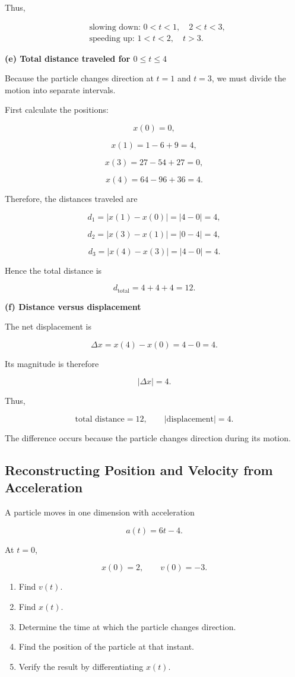 \documentclass[12pt]{article}
\theoremstyle{remark}
\begin{document}
Thus,

\[
\boxed{
\begin{aligned}
&\text{slowing down: } 0<t<1,\quad 2<t<3,\\
&\text{speeding up: } 1<t<2,\quad t>3.
\end{aligned}
}
\]

\textbf{(e) Total distance traveled for \(0\leq t\leq4\)}

Because the particle changes direction at \(t=1\) and \(t=3\), we must divide the motion into separate intervals.

First calculate the positions:

\[
x(0)=0,
\]

\[
x(1)=1-6+9=4,
\]

\[
x(3)=27-54+27=0,
\]

\[
x(4)=64-96+36=4.
\]

Therefore, the distances traveled are

\[
d_1=|x(1)-x(0)|=|4-0|=4,
\]

\[
d_2=|x(3)-x(1)|=|0-4|=4,
\]

\[
d_3=|x(4)-x(3)|=|4-0|=4.
\]

Hence the total distance is

\[
\boxed{
d_{\mathrm{total}}=4+4+4=12.
}
\]

\textbf{(f) Distance versus displacement}

The net displacement is

\[
\Delta x=x(4)-x(0)=4-0=4.
\]

Its magnitude is therefore

\[
|\Delta x|=4.
\]

Thus,

\[
\boxed{
\text{total distance}=12,
\qquad
|\text{displacement}|=4.
}
\]

The difference occurs because the particle changes direction during its motion.


\subsection{Reconstructing Position and Velocity from Acceleration}

A particle moves in one dimension with acceleration

\[
a(t)=6t-4.
\]

At \(t=0\),

\[
x(0)=2,
\qquad
v(0)=-3.
\]

\begin{enumerate}
    \item Find \(v(t)\).
    \item Find \(x(t)\).
    \item Determine the time at which the particle changes direction.
    \item Find the position of the particle at that instant.
    \item Verify the result by differentiating \(x(t)\).
\end{enumerate}
\end{document}
